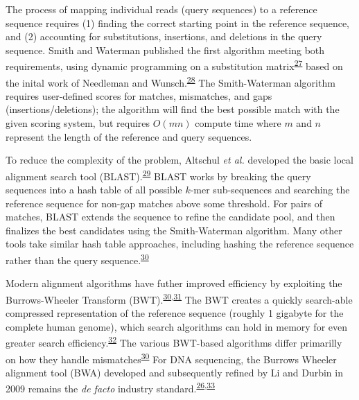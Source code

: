 \documentclass[11pt,letterpaper]{book}
\begin{document}
The process of mapping individual reads (query sequences) to a reference sequence requires (1) finding the correct starting point in the reference sequence, and (2) accounting for substitutions, insertions, and deletions in the query sequence.
Smith and Waterman published the first algorithm meeting both requirements, using dynamic programming on a substitution matrix\textsuperscript{\protect\hyperlink{ref-smith:1981aa}{27}} based on the inital work of Needleman and Wunsch.\textsuperscript{\protect\hyperlink{ref-needleman:1970aa}{28}}
The Smith-Waterman algorithm requires user-defined scores for matches, mismatches, and gaps (insertions/deletions); the algorithm will find the best possible match with the given scoring system, but requires \(O(mn)\) compute time where \(m\) and \(n\) represent the length of the reference and query sequences.

To reduce the complexity of the problem, Altschul \emph{et al.} developed the basic local alignment search tool (BLAST).\textsuperscript{\protect\hyperlink{ref-altschul:1990aa}{29}}
BLAST works by breaking the query sequences into a hash table of all possible \(k\)-mer sub-sequences and searching the reference sequence for non-gap matches above some threshold.
For pairs of matches, BLAST extends the sequence to refine the candidate pool, and then finalizes the best candidates using the Smith-Waterman algorithm.
Many other tools take similar hash table approaches, including hashing the reference sequence rather than the query sequence.\textsuperscript{\protect\hyperlink{ref-li:2010aa}{30}}

Modern alignment algorithms have futher improved efficiency by exploiting the Burrows-Wheeler Transform (BWT).\textsuperscript{\protect\hyperlink{ref-li:2010aa}{30},\protect\hyperlink{ref-burrows:1994aa}{31}}
The BWT creates a quickly search-able compressed representation of the reference sequence (roughly 1 gigabyte for the complete human genome), which search algorithms can hold in memory for even greater search efficiency.\textsuperscript{\protect\hyperlink{ref-lam:2008aa}{32}}
The various BWT-based algorithms differ primarilly on how they handle mismatches\textsuperscript{\protect\hyperlink{ref-li:2010aa}{30}}
For DNA sequencing, the Burrows Wheeler alignment tool (BWA) developed and subsequently refined by Li and Durbin in 2009 remains the \emph{de facto} industry standard.\textsuperscript{\protect\hyperlink{ref-li:2009aa}{26},\protect\hyperlink{ref-li:2010ab}{33}}
\end{document}

